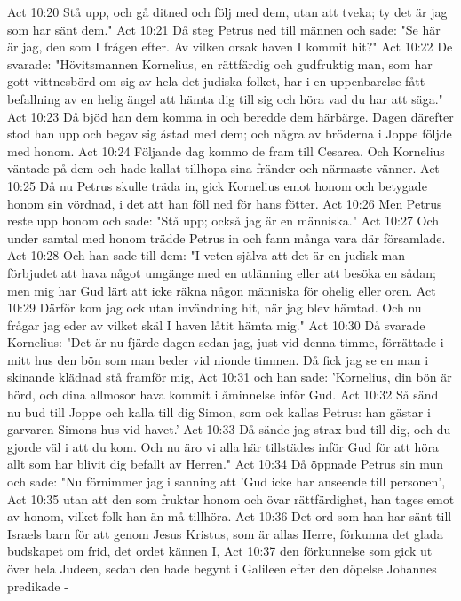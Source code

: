 Act 10:20  Stå upp, och gå ditned och följ med dem, utan att tveka; ty det är jag som har sänt dem."
Act 10:21  Då steg Petrus ned till männen och sade: "Se här är jag, den som I frågen efter. Av vilken orsak haven I kommit hit?"
Act 10:22  De svarade: "Hövitsmannen Kornelius, en rättfärdig och gudfruktig man, som har gott vittnesbörd om sig av hela det judiska folket, har i en uppenbarelse fått befallning av en helig ängel att hämta dig till sig och höra vad du har att säga."
Act 10:23  Då bjöd han dem komma in och beredde dem härbärge. Dagen därefter stod han upp och begav sig åstad med dem; och några av bröderna i Joppe följde med honom.
Act 10:24  Följande dag kommo de fram till Cesarea. Och Kornelius väntade på dem och hade kallat tillhopa sina fränder och närmaste vänner.
Act 10:25  Då nu Petrus skulle träda in, gick Kornelius emot honom och betygade honom sin vördnad, i det att han föll ned för hans fötter.
Act 10:26  Men Petrus reste upp honom och sade: "Stå upp; också jag är en människa."
Act 10:27  Och under samtal med honom trädde Petrus in och fann många vara där församlade.
Act 10:28  Och han sade till dem: "I veten själva att det är en judisk man förbjudet att hava något umgänge med en utlänning eller att besöka en sådan; men mig har Gud lärt att icke räkna någon människa för ohelig eller oren.
Act 10:29  Därför kom jag ock utan invändning hit, när jag blev hämtad. Och nu frågar jag eder av vilket skäl I haven låtit hämta mig."
Act 10:30  Då svarade Kornelius: "Det är nu fjärde dagen sedan jag, just vid denna timme, förrättade i mitt hus den bön som man beder vid nionde timmen. Då fick jag se en man i skinande klädnad stå framför mig,
Act 10:31  och han sade: 'Kornelius, din bön är hörd, och dina allmosor hava kommit i åminnelse inför Gud.
Act 10:32  Så sänd nu bud till Joppe och kalla till dig Simon, som ock kallas Petrus: han gästar i garvaren Simons hus vid havet.'
Act 10:33  Då sände jag strax bud till dig, och du gjorde väl i att du kom. Och nu äro vi alla här tillstädes inför Gud för att höra allt som har blivit dig befallt av Herren."
Act 10:34  Då öppnade Petrus sin mun och sade: "Nu förnimmer jag i sanning att 'Gud icke har anseende till personen',
Act 10:35  utan att den som fruktar honom och övar rättfärdighet, han tages emot av honom, vilket folk han än må tillhöra.
Act 10:36  Det ord som han har sänt till Israels barn för att genom Jesus Kristus, som är allas Herre, förkunna det glada budskapet om frid, det ordet kännen I,
Act 10:37  den förkunnelse som gick ut över hela Judeen, sedan den hade begynt i Galileen efter den döpelse Johannes predikade -
